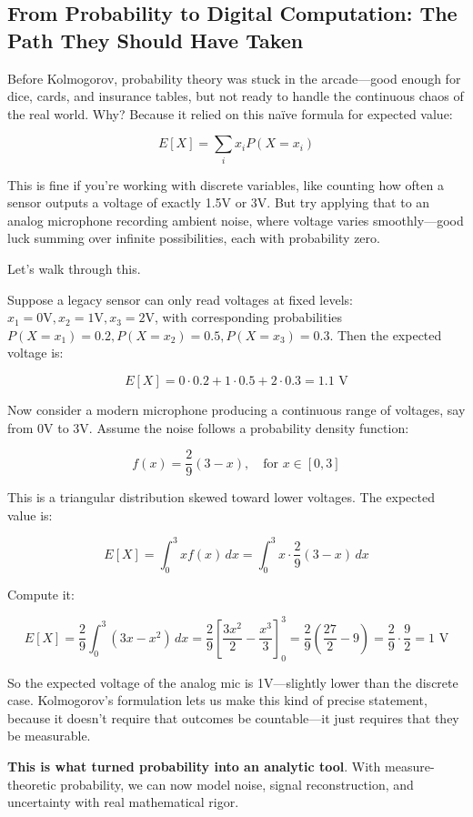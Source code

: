 \subsection{From Probability to Digital Computation: The Path They Should Have Taken}  

Before Kolmogorov, probability theory was stuck in the arcade—good enough for dice, cards, and insurance tables, but not ready to handle the continuous chaos of the real world. Why? Because it relied on this naïve formula for expected value:

\[
E[X] = \sum_{i} x_i P(X = x_i)
\]

This is fine if you’re working with discrete variables, like counting how often a sensor outputs a voltage of exactly 1.5V or 3V. But try applying that to an analog microphone recording ambient noise, where voltage varies smoothly—good luck summing over infinite possibilities, each with probability zero.

Let’s walk through this.

Suppose a legacy sensor can only read voltages at fixed levels:  
\( x_1 = 0\text{V}, x_2 = 1\text{V}, x_3 = 2\text{V} \),  
with corresponding probabilities \( P(X = x_1) = 0.2, P(X = x_2) = 0.5, P(X = x_3) = 0.3 \).  
Then the expected voltage is:

\[
E[X] = 0 \cdot 0.2 + 1 \cdot 0.5 + 2 \cdot 0.3 = 1.1 \text{ V}
\]

Now consider a modern microphone producing a continuous range of voltages, say from 0V to 3V. Assume the noise follows a probability density function:

\[
f(x) = \frac{2}{9}(3 - x), \quad \text{for } x \in [0, 3]
\]

This is a triangular distribution skewed toward lower voltages. The expected value is:

\[
E[X] = \int_0^3 x f(x)\,dx = \int_0^3 x \cdot \frac{2}{9}(3 - x)\,dx
\]

Compute it:

\[
E[X] = \frac{2}{9} \int_0^3 (3x - x^2)\,dx = \frac{2}{9} \left[ \frac{3x^2}{2} - \frac{x^3}{3} \right]_0^3 = \frac{2}{9} \left( \frac{27}{2} - 9 \right) = \frac{2}{9} \cdot \frac{9}{2} = 1 \text{ V}
\]

So the expected voltage of the analog mic is 1V—slightly lower than the discrete case. Kolmogorov’s formulation lets us make this kind of precise statement, because it doesn’t require that outcomes be countable—it just requires that they be measurable.

\textbf{This is what turned probability into an analytic tool}. With measure-theoretic probability, we can now model noise, signal reconstruction, and uncertainty with real mathematical rigor.


